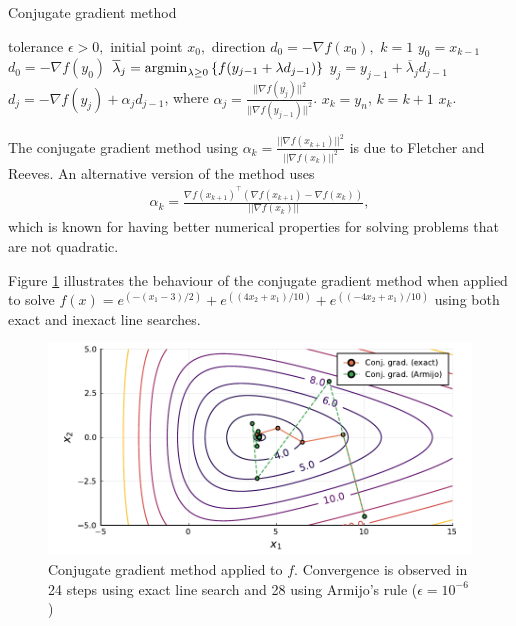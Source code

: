 \begin{algorithm}[H]
\caption{Conjugate gradient method} \label{Alg2}
\begin{algorithmic}[1] %
 tolerance $\epsilon > 0,$ initial point $x_0,$ direction $d_0 = - \nabla f(x_0),$ $k = 1$ 
	\State $y_0 = x_{k-1}$
	\State $d_0 = -\nabla f(y_0)$
     \label{alg:conj_restart}      
        \State $\overline{\lambda}_j = \mathop{\rm argmin}_{\lambda \geq 0}\left\{ f(y_{j-1} + \lambda d_{j-1}) \right \}$
        \State $y_{j} = y_{j-1} + \overline{\lambda}_j d_{j-1}$
        \State $d_{j} = -\nabla f(y_{j}) + \alpha_jd_{j-1}$, where $\alpha_j = \frac{||\nabla f(y_{j})||^2}{||\nabla f(y_{j-1})||^2}$.
    \EndFor
    \State $x_k = y_n$, $k = k+1$
\EndWhile
{} $x_k$.
\end{algorithmic}
\end{algorithm}

The conjugate gradient method using $\alpha_k = \frac{||\nabla f(x_{k+1})||^2}{||\nabla f(x_k)||^2}$ is due to Fletcher and Reeves. %
	An alternative version of the method uses
	\begin{align*}
		\alpha_k = \frac{\nabla f(x_{k+1})^\top (\nabla f(x_{k+1}) - \nabla f(x_k))}{||\nabla f(x_k)||},
	\end{align*}
	which is known for having better numerical properties for solving  problems that are not quadratic.
	
Figure \ref{fig:conjugate_gradient} illustrates the behaviour of the conjugate gradient method when applied to solve $f(x)=e^{(-(x_1-3)/2)} + e^{((4x_2 + x_1)/10)} + e^{((-4x_2 + x_1)/10)}$ using both exact and inexact line searches. 
%
\begin{figure}
	\includegraphics[width=\textwidth]{part_2/chapter_6/figures/conjugate_gradient.pdf}
	\caption{Conjugate gradient method applied to $f$. Convergence is observed in 24 steps using exact line search and 28 using Armijo's rule ($\epsilon = 10^{-6}$)} \label{fig:conjugate_gradient}	
\end{figure}

